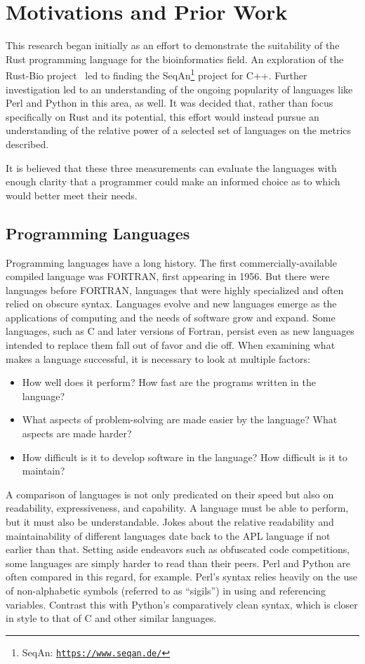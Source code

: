 \section{Motivations and Prior Work}
\label{sec:motivations}

This research began initially as an effort to demonstrate the suitability of the Rust programming language for the bioinformatics field. An exploration of the Rust-Bio project~\cite{rust} led to finding the SeqAn\footnote{SeqAn: \texttt{\url{https://www.seqan.de/}}} project for C++. Further investigation led to an understanding of the ongoing popularity of languages like Perl and Python in this area, as well. It was decided that, rather than focus specifically on Rust and its potential, this effort would instead pursue an understanding of the relative power of a selected set of languages on the metrics described.

It is believed that these three measurements can evaluate the languages with enough clarity that a programmer could make an informed choice as to which would better meet their needs.

\subsection{Programming Languages}

Programming languages have a long history. The first commercially-available compiled language was FORTRAN, first appearing in 1956. But there were languages before FORTRAN, languages that were highly specialized and often relied on obscure syntax. Languages evolve and new languages emerge as the applications of computing and the needs of software grow and expand. Some languages, such as C and later versions of Fortran, persist even as new languages intended to replace them fall out of favor and die off. When examining what makes a language successful, it is necessary to look at multiple factors:

\begin{itemize}
\item How well does it perform? How fast are the programs written in the language?
\item What aspects of problem-solving are made easier by the language? What aspects are made harder?
\item How difficult is it to develop software in the language? How difficult is it to maintain?
\end{itemize}

A comparison of languages is not only predicated on their speed but also on readability, expressiveness, and capability. A language must be able to perform, but it must also be understandable. Jokes about the relative readability and maintainability of different languages date back to the APL language if not earlier than that. Setting aside endeavors such as obfuscated code competitions, some languages are simply harder to read than their peers. Perl and Python are often compared in this regard, for example. Perl's syntax relies heavily on the use of non-alphabetic symbols (referred to as ``sigils'') in using and referencing variables. Contrast this with Python's comparatively clean syntax, which is closer in style to that of C and other similar languages.

